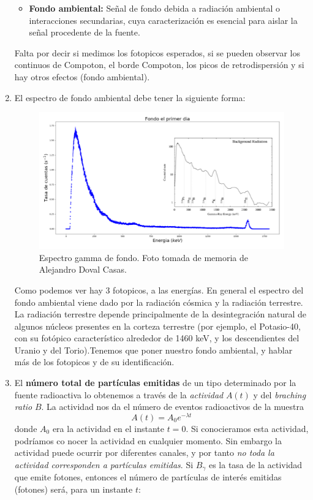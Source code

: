 \documentclass[11pt]{article}
\begin{document}
\begin{enumerate}[label=\alph*)]
\begin{itemize}
        \item \textbf{Fondo ambiental:} Señal de fondo debida a radiación ambiental o interacciones secundarias, cuya caracterización es esencial para aislar la señal procedente de la fuente.
    \end{itemize}
    \textcolor{BrickRed}{Falta por decir si medimos los fotopicos esperados, si se pueden observar los continuos de Compoton, el borde Compoton, los picos de retrodispersión y si hay otros efectos (fondo ambiental).}
    \item El espectro de fondo ambiental debe tener la siguiente forma:
    \begin{figure}[h!] \centering
        \includegraphics[width=0.6\linewidth]{Espectro_Fondo.png}
        \caption{Espectro gamma de fondo. Foto tomada de memoria de Alejandro Doval Casas.}      
    \end{figure}

    Como podemos ver hay 3 fotopicos, a las energías. En general el espectro del fondo ambiental viene dado por la radiación cósmica y la radiación terrestre. La radiación terrestre depende principalmente de la desintegración natural de algunos núcleos presentes en la corteza terrestre (por ejemplo, el Potasio-40, con su fotópico característico alrededor de 1460 keV, y los descendientes del Uranio y del Torio).\textcolor{BrickRed}{Tenemos que poner nuestro fondo ambiental, y hablar más de los fotopicos y de su identificación.}
    \item El \textbf{número total de partículas emitidas} de un tipo determinado por la fuente radioactiva lo obtenemos a través de la \textit{actividad} $A(t)$ y del \textit{braching ratio} $B$. La actividad nos da el número de eventos radioactivos de la muestra
    \begin{equation}
        A(t) = A_0 e^{-\lambda t}
    \end{equation}
    donde $A_0$ era la actividad en el instante $t=0$. Si conocieramos esta actividad, podríamos co nocer la actividad en cualquier momento. Sin embargo la actividad puede ocurrir por diferentes canales, y por tanto \textit{no toda la actividad corresponden a partículas emitidas}. Si $B_\gamma$ es la tasa de la actividad que emite fotones, entonces el número de partículas de interés emitidas (fotones) será, para un instante $t$:


\end{enumerate}
\end{document}

